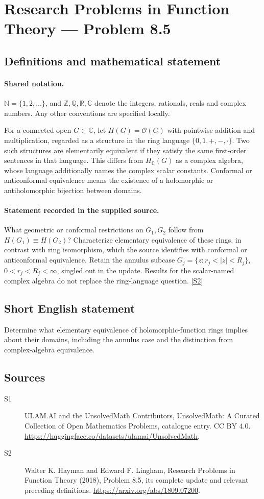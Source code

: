 \documentclass[11pt]{article}
\newcommand{\sref}[2]{\hyperlink{source:#1:#2}{[S#2]}}
\begin{document}
\section{Research Problems in Function Theory — Problem 8.5}\label{statement}

\subsection{Definitions and mathematical statement}

\paragraph{Shared notation.}$\mathbb N=\{1,2,\ldots\}$, and $\mathbb Z,\mathbb Q,\mathbb R,\mathbb C$ denote the integers, rationals, reals and complex numbers. Any other conventions are specified locally.


For a connected open $G\subset\mathbb C$, let $H(G)=\mathcal O(G)$ with pointwise addition and multiplication, regarded as a structure in the ring language $\{0,1,+,-,\cdot\}$. Two such structures are elementarily equivalent if they satisfy the same first-order sentences in that language. This differs from $H_{\mathbb C}(G)$ as a complex algebra, whose language additionally names the complex scalar constants. Conformal or anticonformal equivalence means the existence of a holomorphic or antiholomorphic bijection between domains.
\paragraph{Statement recorded in the supplied source.}
What geometric or conformal restrictions on $G_1,G_2$ follow from $H(G_1)\equiv H(G_2)$? Characterize elementary equivalence of these rings, in contrast with ring isomorphism, which the source identifies with conformal or anticonformal equivalence. Retain the annulus subcase $G_j=\{z:r_j<|z|<R_j\}$, $0<r_j<R_j<\infty$, singled out in the update. Results for the scalar-named complex algebra do not replace the ring-language question. \sref{statement}{2}
\subsection{Short English statement}
Determine what elementary equivalence of holomorphic-function rings implies about their domains, including the annulus case and the distinction from complex-algebra equivalence.
\subsection{Sources}
\begin{description}
\item[\hypertarget{source:statement:1}{S1}] ULAM.AI and the UnsolvedMath Contributors, UnsolvedMath: A Curated Collection of Open Mathematics Problems, catalogue entry. CC BY 4.0. \url{https://huggingface.co/datasets/ulamai/UnsolvedMath}.
\item[\hypertarget{source:statement:2}{S2}] Walter K. Hayman and Edward F. Lingham, Research Problems in Function Theory (2018), Problem 8.5, its complete update and relevant preceding definitions. \url{https://arxiv.org/abs/1809.07200}.
\end{description}
\label{end:statement}
\end{document}
